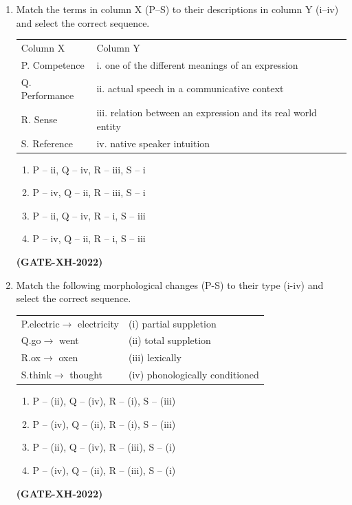 \documentclass[journal]{IEEEtran}
\begin{document}
\begin{enumerate}
\item Match the terms in column X (P–S) to their descriptions in column Y (i–iv) and select the correct sequence.  \\
\begin{tabular}{p{3cm} p{9cm}}
    Column X  &Column Y\\
P. Competence &i. one of the different meanings of an expression\\
Q. Performance &ii. actual speech in a communicative context\\
R. Sense &iii. relation between an expression and its real world entity\\
S. Reference &iv. native speaker intuition
\end{tabular}
\begin{multicols}{2}
\begin{enumerate}
\item P – ii, Q – iv, R – iii, S – i  
\item P – iv, Q – ii, R – iii, S – i  
\item P – ii, Q – iv, R – i, S – iii  
\item P – iv, Q – ii, R – i, S – iii  
\end{enumerate}
\end{multicols}
\hfill\textbf{(GATE-XH-2022)}

\item Match the following morphological changes (P-S) to their type (i-iv) and select the correct sequence.\\
\begin{tabular}{p{4cm}|p{6cm}}
   P.electric$\rightarrow$ electricity  & (i) partial suppletion \\
   Q.go$\rightarrow$ went  & (ii) total suppletion \\
   R.ox$\rightarrow$ oxen &  (iii) lexically \\
   S.think$\rightarrow$ thought & (iv) phonologically conditioned\\
\end{tabular}
\begin{multicols}{2}
\begin{enumerate}
\item P – (ii), Q – (iv), R – (i), S – (iii)  
\item P – (iv), Q – (ii), R – (i), S – (iii)  
\item P – (ii), Q – (iv), R – (iii), S – (i)  
\item P – (iv), Q – (ii), R – (iii), S – (i)  
\end{enumerate}
\end{multicols}
\hfill\textbf{(GATE-XH-2022)}


\end{enumerate}
\end{document}
